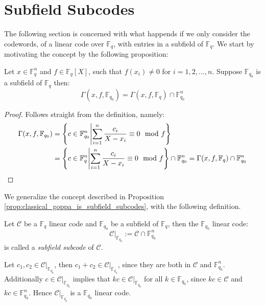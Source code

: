 \section{Subfield Subcodes}%
The following section is concerned with what happends if we only consider the codewords, of a linear code over $\mathbb{F}_q$, with entries in a subfield of $\mathbb{F}_q$. We start by motivating the concept by the following proposition:
\begin{proposition}\label{prop:classical_goppa_is_subfield_subcodes}
  Let $x \in \mathbb{F}_q^n$ and $f \in \mathbb{F}_q[X]$, such that $f(x_i) \neq 0$ for $i = 1, 2, \ldots, n$.
  Suppose $\mathbb{F}_{q_0}$ is a subfield of $\mathbb{F}_q$ then:
  \begin{equation*}
    \Gamma(x, f, \mathbb{F}_{q_0}) = \Gamma(x, f, \mathbb{F}_q) \cap \mathbb{F}_{q_0}^n
  \end{equation*}
\end{proposition}
\begin{proof}
  Follows straight from the definition, namely:
  \begin{align*}
  \Gamma(x, f, \mathbb{F}_{q_0}) &= \left\{c \in \mathbb{F}_{q_0}^n \middle| \sum_{i = 1}^n \frac{c_{i}}{X - x_{i}} \equiv 0 \mod f\right\}\\ &=\left\{c \in \mathbb{F}_{q}^n \middle| \sum_{i = 1}^n \frac{c_{i}}{X - x_{i}} \equiv 0 \mod f\right\} \cap \mathbb{F}_{q_0}^{n} = \Gamma(x, f, \mathbb{F}_q) \cap \mathbb{F}_{q_0}^n\qedhere
  \end{align*}
\end{proof}

We generalize the concept described in Proposition \ref{prop:classical_goppa_is_subfield_subcodes}, with the following definition.
\begin{definition}
  Let $\mathcal{C}$ be a $\mathbb{F}_q$ linear code and $\mathbb{F}_{q_0}$ be a subfield of $\mathbb{F}_q$, then the $\mathbb{F}_{q_0}$ linear code:
  \begin{equation*}
  \mathcal{C}\vert_{\mathbb{F}_{q_0}} := \mathcal{C} \cap \mathbb{F}_{q_0}^{n}
  \end{equation*}
  is called a \textit{subfield subcode} of $\mathcal{C}$.
\end{definition}
Let $c_{1}, c_{2} \in \mathcal{C} \vert_{\mathbb{F}_{q_0}}$, then $c_{1} + c_{2} \in \mathcal{C} \vert_{\mathbb{F}_{q_0}}$, since they are both in $\mathcal{C}$ and $\mathbb{F}_{q_0}^n$. Additionally $c \in \mathcal{C} \vert_{\mathbb{F}_{q_{0}}}$ implies that $kc \in \mathcal{C} \vert_{\mathbb{F}_{q_0}}$ for all  $k \in \mathbb{F}_{q_0}$, since $kc \in \mathcal{C}$ and $kc \in \mathbb{F}_{q_0}^{n}$. Hence $\mathcal{C} \vert_{\mathbb{F}_{q_0}}$ is a $\mathbb{F}_{q_{0}}$ linear code.

